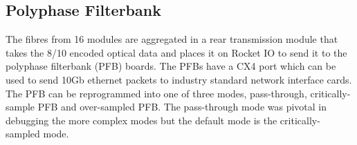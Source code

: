 \subsection{Polyphase Filterbank}
The fibres from 16 modules are aggregated in a rear transmission module that takes the 8/10 encoded optical data and places it on Rocket IO to send it to the polyphase filterbank (PFB) boards. The PFBs have a CX4 port which can be used to send 10Gb ethernet packets to industry standard network interface cards. The PFB can be reprogrammed into one of three modes, pass-through, critically-sample PFB and over-sampled PFB. The pass-through mode was pivotal in debugging the more complex modes but the default mode is the critically-sampled mode.
